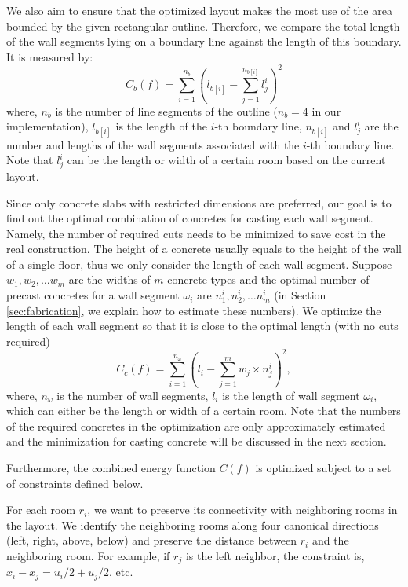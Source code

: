 We also aim to ensure that the optimized layout makes the most use of the area bounded by the given rectangular outline. Therefore, we compare the total length of the wall segments lying on a boundary line against the length of this boundary. It is measured by:
\begin{equation}\label{costBoundary}
C_b(f) = \sum_{i=1}^{n_b}( l_{b[i]} - \sum_{j=1}^{ n_{b[i]} } l_j^i )^2
\end{equation}
where, $n_b$ is the number of line segments of the outline ($n_b = 4$ in our implementation), $l_{b[i]}$ is the length of the $i$-th boundary line, $n_{b[i]}$ and $l_j^i$ are the number and lengths of the wall segments associated with the $i$-th boundary line. Note that $l_j^i$ can be the length or width of a certain room based on the current layout.

Since only concrete slabs with restricted dimensions are preferred, our goal is to find out the optimal combination of concretes for casting each wall segment. Namely, the number of required cuts needs to be minimized to save cost in the real construction. The height of a concrete usually equals to the height of the wall of a single floor, thus we only consider the length of each wall segment. Suppose $w_1, w_2, \dots w_m$ are the widths of $m$ concrete types and the optimal number of precast concretes for a wall segment $\omega_i$ are $n_1^i, n_2^i, \dots n_m^i$ (in Section \ref{sec:fabrication}, we explain how to estimate these numbers). We optimize the length of each wall segment so that it is close to the optimal length (with no cuts required)
\begin{equation}\label{costConcrete}
C_c(f) = \sum_{i = 1}^{n_{\omega}}(l_i - \sum_{j=1}^m w_j \times n_j^i )^2,
\end{equation}
where, $n_{\omega}$ is the number of wall segments, $l_i$ is the length of wall segment $\omega_i$, which can either be the length or width of a certain room.
Note that the numbers of the required concretes in the optimization are only approximately estimated and the minimization for casting concrete will be discussed in the next section.

Furthermore, the combined energy function $C(f)$ is optimized subject to a set of constraints defined below.

For each room $r_i$, we want to preserve its connectivity with neighboring rooms in the layout. We identify the neighboring rooms along four canonical directions (left, right, above, below) and preserve the distance between $r_i$ and the neighboring room. For example, if $r_j$ is the left neighbor, the constraint is,
$x_i - x_j = {u_i}/{2} + {u_j}/{2}$, etc.

